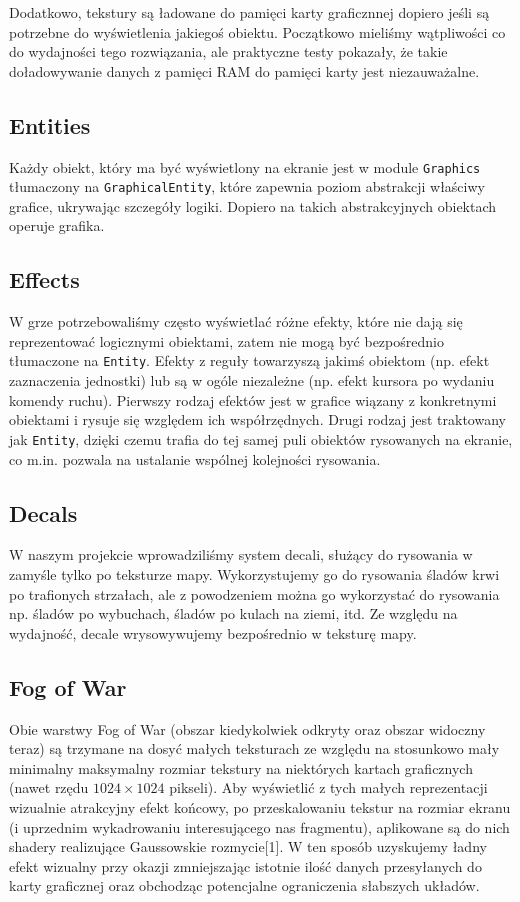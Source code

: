 \documentclass[licencjacka]{pracamgr}
\begin{document}
      Dodatkowo, tekstury są ładowane do pamięci karty graficznnej dopiero jeśli są potrzebne do wyświetlenia jakiegoś
      obiektu. Początkowo mieliśmy wątpliwości co do wydajności tego rozwiązania, ale praktyczne testy pokazały, że
      takie doładowywanie danych z pamięci RAM do pamięci karty jest niezauważalne.

    \subsection{Entities}
      Każdy obiekt, który ma być wyświetlony na ekranie jest w module \texttt{Graphics} tłumaczony na \texttt{GraphicalEntity}, które
      zapewnia poziom abstrakcji właściwy grafice, ukrywając szczegóły logiki. Dopiero na takich abstrakcyjnych
      obiektach operuje grafika.

    \subsection{Effects}
      W grze potrzebowaliśmy często wyświetlać różne efekty, które nie dają się reprezentować logicznymi obiektami,
      zatem nie mogą być bezpośrednio tłumaczone na \texttt{Entity}. Efekty z reguły towarzyszą jakimś obiektom (np. efekt
      zaznaczenia jednostki) lub są w ogóle niezależne (np. efekt kursora po wydaniu komendy ruchu). Pierwszy rodzaj
      efektów jest w grafice wiązany z konkretnymi obiektami i rysuje się względem ich współrzędnych. Drugi rodzaj jest
      traktowany jak \texttt{Entity}, dzięki czemu trafia do tej samej puli obiektów rysowanych na ekranie, co m.in. pozwala na
      ustalanie wspólnej kolejności rysowania.

    \subsection{Decals}
      W naszym projekcie wprowadziliśmy system decali, służący do rysowania w zamyśle tylko po teksturze mapy.
      Wykorzystujemy go do rysowania śladów krwi po trafionych strzałach, ale z powodzeniem można go wykorzystać do
      rysowania np. śladów po wybuchach, śladów po kulach na ziemi, itd. Ze względu na wydajność, decale wrysowywujemy
      bezpośrednio w teksturę mapy.

    \subsection{Fog of War}
      Obie warstwy Fog of War (obszar kiedykolwiek odkryty oraz obszar widoczny teraz) są trzymane na dosyć małych
      teksturach ze względu na stosunkowo mały minimalny maksymalny rozmiar tekstury na niektórych kartach graficznych
      (nawet rzędu $1024 \times 1024$ pikseli). Aby wyświetlić z tych małych reprezentacji wizualnie atrakcyjny efekt
      końcowy, po przeskalowaniu tekstur na rozmiar ekranu (i uprzednim wykadrowaniu interesującego nas fragmentu),
      aplikowane są do nich shadery realizujące Gaussowskie rozmycie[1]. W ten sposób uzyskujemy ładny efekt wizualny
      przy okazji zmniejszając istotnie ilość danych przesyłanych do karty graficznej oraz obchodząc potencjalne
      ograniczenia słabszych układów.
\end{document}
